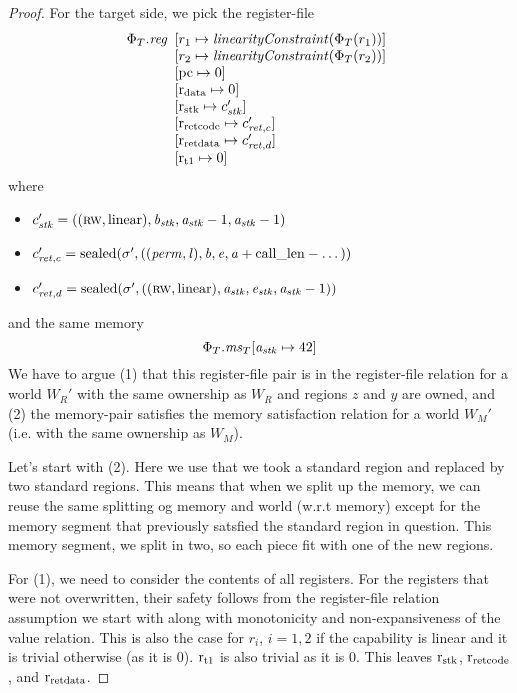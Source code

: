\documentclass[a4paper]{article}
\begin{document}
\begin{proof}
For the target side, we pick the register-file
\[
  \Phi_T.\reg
  \begin{array}[t]{l}
    \update{r_1}{\linCons{\Phi_T(r_1)}}\\
    \update{r_2}{\linCons{\Phi_T(r_2)}}\\
    \update{\pcreg}{0} \\
    \update{\rdata}{0} \\
    \update{\rstk}{c_\stk'}\\
    \update{\rretc}{c_{\ret,c}'}\\
    \update{\rretd}{c_{\ret,d}'}\\
    \update{\rtmp{1}}{0}\\
  \end{array}  
\]
where
\begin{itemize}
\item $c_{\mathit{stk}}' = ((\textsc{rw},\mathrm{linear}),\mathit{b}_{\mathit{stk}},\mathit{a}_{\mathit{stk}}-1,\mathit{a}_{\mathit{stk}}-1)$
\item $c_{\mathit{ret},c}' = \mathrm{sealed}(\sigma',((\mathit{perm},\mathit{l}),\mathit{b},\mathit{e},\mathit{a}+\mathrm{call\_len}-\dots))$
\item $c_{\mathit{ret},d}' = \mathrm{sealed}(\sigma',((\textsc{rw},\mathrm{linear}),\mathit{a}_{\mathit{stk}},\mathit{e}_{\mathit{stk}},\mathit{a}_{\mathit{stk}}-1))$
\end{itemize}
and the same memory
\[
  \Phi_T.\mathit{ms}_T[\mathit{a}_{\mathit{stk}} \mapsto 42]
\]
We have to argue (1) that this register-file pair is in the register-file relation for a world $W_R'$ with the same ownership as $W_R$ and regions $z$ and $y$ are owned, and (2) the memory-pair satisfies the memory satisfaction relation for a world $W_M'$ (i.e. with the same ownership as $W_M$).
 
Let's start with (2). Here we use that we took a standard region and replaced by two standard regions. This means that when we split up the memory, we can reuse the same splitting og memory and world (w.r.t memory) except for the memory segment that previously satsfied the standard region in question. This memory segment, we split in two, so each piece fit with one of the new regions.

For (1), we need to consider the contents of all registers. For the registers that were not overwritten, their safety follows from the register-file relation assumption we start with along with monotonicity and non-expansiveness of the value relation. This is also the case for $r_i$, $i=1,2$ if the capability is linear and it is trivial otherwise (as it is $0$). $\mathrm{r}_\mathrm{t1}$ is also trivial as it is $0$. This leaves $\mathrm{r}_\mathrm{stk}$, $\mathrm{r}_\mathrm{ret code}$, and $\mathrm{r}_\mathrm{ret data}$.


\end{proof}
\end{document}
